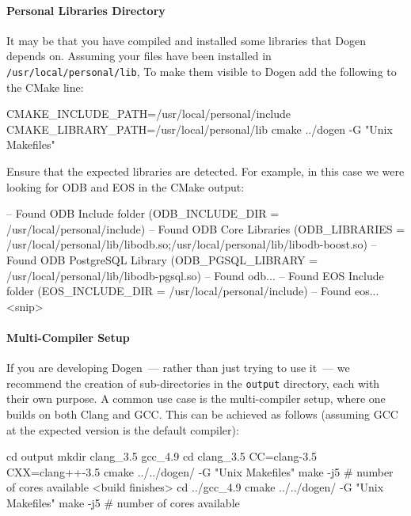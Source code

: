 \documentclass{book}
\begin{document}
\paragraph{Personal Libraries Directory}

It may be that you have compiled and installed some libraries that
Dogen depends on. Assuming your files have been installed in
\texttt{/usr/local/personal/lib}, To make them visible to Dogen add
the following to the CMake line:

\begin{pseudocode}[backgroundcolor=\color{lightgray}]
CMAKE_INCLUDE_PATH=/usr/local/personal/include CMAKE_LIBRARY_PATH=/usr/local/personal/lib cmake ../dogen -G "Unix Makefiles"
\end{pseudocode}

Ensure that the expected libraries are detected. For example, in this
case we were looking for ODB and EOS in the CMake output:

\begin{pseudocode}[backgroundcolor=\color{lightgray}]
-- Found ODB Include folder (ODB_INCLUDE_DIR = /usr/local/personal/include)
-- Found ODB Core Libraries (ODB_LIBRARIES = /usr/local/personal/lib/libodb.so;/usr/local/personal/lib/libodb-boost.so)
-- Found ODB PostgreSQL Library (ODB_PGSQL_LIBRARY = /usr/local/personal/lib/libodb-pgsql.so)
-- Found odb...
-- Found EOS Include folder (EOS_INCLUDE_DIR = /usr/local/personal/include)
-- Found eos...
<snip>
\end{pseudocode}

\paragraph{Multi-Compiler Setup}

If you are developing Dogen~--- rather than just trying to use it~---
we recommend the creation of sub-directories in the \texttt{output}
directory, each with their own purpose. A common use case is the
multi-compiler setup, where one builds on both Clang and GCC. This can
be achieved as follows (assuming GCC at the expected version is the
default compiler):

\begin{pseudocode}[backgroundcolor=\color{lightgray}]
cd output
mkdir clang_3.5 gcc_4.9
cd clang_3.5
CC=clang-3.5 CXX=clang++-3.5 cmake ../../dogen/ -G "Unix Makefiles"
make -j5 # number of cores available
<build finishes>
cd ../gcc_4.9
cmake ../../dogen/ -G "Unix Makefiles"
make -j5 # number of cores available
\end{pseudocode}
\end{document}
